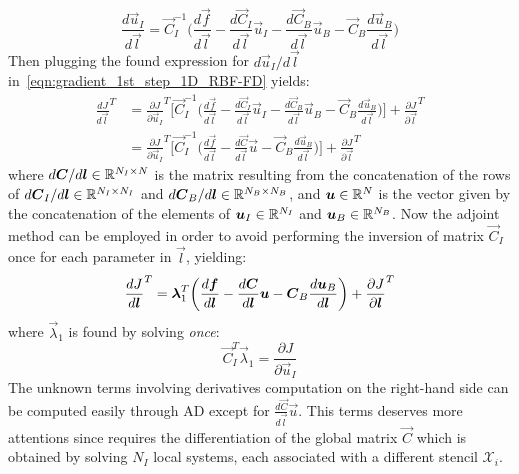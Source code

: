 \begin{equation}
	\frac{d \vec{u}_I}{d \vec{l}} = \vec{C}_I^{-1} \biggl( \frac{d\vec{f}}{d\vec{l}} - \frac{d\vec{C}_I}{d\vec{l}} \vec{u}_I - \frac{d\vec{C}_B}{d\vec{l}} \vec{u}_B - \vec{C}_B \frac{d\vec{u}_B}{d\vec{l}} \biggr)
\end{equation} 
Then plugging the found expression for $d\vec{u}_I / d\vec{l}$ in~\eqref{eqn:gradient_1st_step_1D_RBF-FD} yields:
\begin{equation}
	\begin{aligned}
		\frac{dJ}{d\vec{l}}^T & = \frac{\partial J}{\partial \vec{u}_I}^T \biggl[ \vec{C}_I^{-1} \biggl( \frac{d\vec{f}}{d\vec{l}} - \frac{d\vec{C}_I}{d\vec{l}} \vec{u}_I - \frac{d\vec{C}_B}{d\vec{l}} \vec{u}_B - \vec{C}_B \frac{d\vec{u}_B}{d\vec{l}} \biggr) \biggr] + \frac{\partial J}{\partial \vec{l}}^T  \\[2ex]
		& = \frac{\partial J}{\partial \vec{u}_I}^T \biggl[ \vec{C}_I^{-1} \biggl( \frac{d\vec{f}}{d\vec{l}} - \frac{d\vec{C}}{d\vec{l}} \vec{u} - \vec{C}_B \frac{d\vec{u}_B}{d\vec{l}} \biggr) \biggr] + \frac{\partial J}{\partial \vec{l}}^T
	\end{aligned}
\end{equation}
where $d\vec{C} / d\vec{l} \in \R^{N_I \times N}$ is the matrix resulting from the concatenation of the rows of $d\vec{C}_I / d\vec{l} \in \R^{N_I \times N_I}$ and $d\vec{C}_B / d\vec{l} \in \R^{N_B \times N_B}$, and $\vec{u} \in \R^{N}$ is the vector given by the concatenation of the elements of $\vec{u}_I \in \R^{N_I}$ and $\vec{u}_B \in \R^{N_B}$.
Now the adjoint method can be employed in order to avoid performing the inversion of matrix $\vec{C}_I$ once for each parameter in $\vec{l}$, yielding:
\begin{equation}
	\frac{dJ}{d\vec{l}}^T =  \vec{\lambda}_1^T \biggl( \frac{d\vec{f}}{d\vec{l}} - \frac{d\vec{C}}{d\vec{l}} \vec{u} - \vec{C}_B \frac{d\vec{u}_B}{d\vec{l}} \biggr) + \frac{\partial J}{\partial \vec{l}}^T  \\
\end{equation}
where $\vec{\lambda}_1$ is found by solving \emph{once}:
\begin{equation}
	\vec{C}_I^T \vec{\lambda}_1 = \frac{\partial J}{\partial \vec{u}_I}
\end{equation}
The unknown terms involving derivatives computation on the right-hand side can be computed easily through AD except for $\frac{d\vec{C}}{d\vec{l}} \vec{u}$. This terms deserves more attentions since requires the differentiation of the global matrix $\vec{C}$ which is obtained by solving $N_I$ local systems, each associated with a different stencil $\mathcal{X}_i$.


